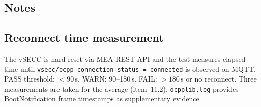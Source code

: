 \documentclass[10pt, a4paper]{article}
\begin{document}
\subsection*{Notes}

\subsection*{Reconnect time measurement}
The vSECC is hard-reset via MEA REST API and the test measures elapsed time until
\texttt{vsecc/ocpp\_connection\_status = connected} is observed on MQTT.
PASS threshold: $<90$\,s. WARN: 90--180\,s. FAIL: $>180$\,s or no reconnect.
Three measurements are taken for the average (item~11.2).
\texttt{ocpplib.log} provides BootNotification frame timestamps as supplementary evidence.
\end{document}
